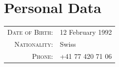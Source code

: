 \documentclass[a4paper,11pt]{article} %
\begin{document}

\section{Personal Data}
\begin{center}
\begin{tabular}{rl}
\textsc{Date of Birth:} & 12 February 1992 \\
\textsc{Nationality:} & Swiss \\
\textsc{Phone:} & +41 77 420 71 06\\
\end{tabular}
\end{center}
\end{document}
